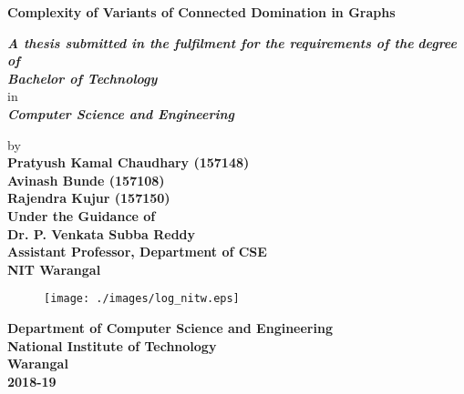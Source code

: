 \begin{center}
{\normalsize
 {\Large \bf Complexity of Variants of Connected Domination in Graphs \\}

\vspace{1cm}

{\em \bf A thesis submitted in the fulfilment for the requirements of the}
{\em \bf degree of\\ 
{\large \bf Bachelor of Technology\\}}
{in}\\
{\em \bf \large Computer Science and Engineering}

{ by}\\
\vspace*{0.5cm}
{\large{\bf Pratyush Kamal Chaudhary (157148)}}\\
{\large{\bf Avinash Bunde (157108)}}\\
{\large{\bf Rajendra Kujur (157150)}}\\


\vspace*{1cm}
{\bf Under the Guidance of }\\
\vspace*{0.3cm}
{\large{\bf Dr. P. Venkata Subba Reddy}}\\
{\large{\bf Assistant Professor, Department of CSE}}\\
{\large{\bf NIT Warangal}}\\

\vspace*{0.3cm}

\vspace*{1.0cm}

\begin{figure}[ht]
\centering
\texttt{[image: ./images/log\_nitw.eps]}
\end{figure}

\large{\bf Department of Computer Science and Engineering}\\
\large{
\bf National Institute of Technology\\ Warangal}\\

{\bf 2018-19}
}
\end{center}